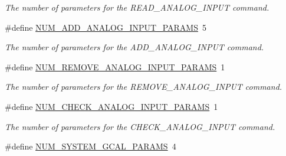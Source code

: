 \begin{DoxyCompactItemize}
\begin{DoxyCompactList}\small\item\em The number of parameters for the R\-E\-A\-D\-\_\-\-A\-N\-A\-L\-O\-G\-\_\-\-I\-N\-P\-U\-T command. \end{DoxyCompactList}\item 
\hypertarget{group__command__interpreter_gaf0d093bb26c186189433bbd8007cf0c0}{\#define \hyperlink{group__command__interpreter_gaf0d093bb26c186189433bbd8007cf0c0}{N\-U\-M\-\_\-\-A\-D\-D\-\_\-\-A\-N\-A\-L\-O\-G\-\_\-\-I\-N\-P\-U\-T\-\_\-\-P\-A\-R\-A\-M\-S}~5}\label{group__command__interpreter_gaf0d093bb26c186189433bbd8007cf0c0}

\begin{DoxyCompactList}\small\item\em The number of parameters for the A\-D\-D\-\_\-\-A\-N\-A\-L\-O\-G\-\_\-\-I\-N\-P\-U\-T command. \end{DoxyCompactList}\item 
\hypertarget{group__command__interpreter_gac7fdbccfbee444562e69bbdc64b3d92d}{\#define \hyperlink{group__command__interpreter_gac7fdbccfbee444562e69bbdc64b3d92d}{N\-U\-M\-\_\-\-R\-E\-M\-O\-V\-E\-\_\-\-A\-N\-A\-L\-O\-G\-\_\-\-I\-N\-P\-U\-T\-\_\-\-P\-A\-R\-A\-M\-S}~1}\label{group__command__interpreter_gac7fdbccfbee444562e69bbdc64b3d92d}

\begin{DoxyCompactList}\small\item\em The number of parameters for the R\-E\-M\-O\-V\-E\-\_\-\-A\-N\-A\-L\-O\-G\-\_\-\-I\-N\-P\-U\-T command. \end{DoxyCompactList}\item 
\hypertarget{group__command__interpreter_ga06548395b7cce1059cd7eff8f5bfb433}{\#define \hyperlink{group__command__interpreter_ga06548395b7cce1059cd7eff8f5bfb433}{N\-U\-M\-\_\-\-C\-H\-E\-C\-K\-\_\-\-A\-N\-A\-L\-O\-G\-\_\-\-I\-N\-P\-U\-T\-\_\-\-P\-A\-R\-A\-M\-S}~1}\label{group__command__interpreter_ga06548395b7cce1059cd7eff8f5bfb433}

\begin{DoxyCompactList}\small\item\em The number of parameters for the C\-H\-E\-C\-K\-\_\-\-A\-N\-A\-L\-O\-G\-\_\-\-I\-N\-P\-U\-T command. \end{DoxyCompactList}\item 
\hypertarget{group__command__interpreter_ga5ee0ee8ce38b367ad3e68b77020ddc66}{\#define \hyperlink{group__command__interpreter_ga5ee0ee8ce38b367ad3e68b77020ddc66}{N\-U\-M\-\_\-\-S\-Y\-S\-T\-E\-M\-\_\-\-G\-C\-A\-L\-\_\-\-P\-A\-R\-A\-M\-S}~4}\label{group__command__interpreter_ga5ee0ee8ce38b367ad3e68b77020ddc66}


\end{DoxyCompactItemize}
